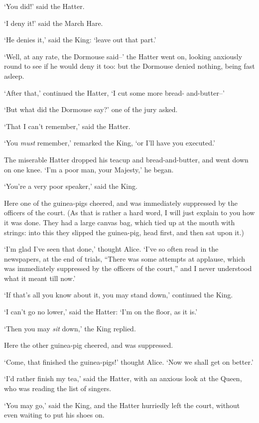   `You did!' said the Hatter.

  `I deny it!' said the March Hare.

  `He denies it,' said the King:  `leave out that part.'

  `Well, at any rate, the Dormouse said--' the Hatter went on,
looking anxiously round to see if he would deny it too:  but the
Dormouse denied nothing, being fast asleep.

  `After that,' continued the Hatter, `I cut some more bread-
and-butter--'

  `But what did the Dormouse say?' one of the jury asked.

  `That I can't remember,' said the Hatter.

  `You {\it must} remember,' remarked the King, `or I'll have you
executed.'

  The miserable Hatter dropped his teacup and bread-and-butter,
and went down on one knee.  `I'm a poor man, your Majesty,' he
began.

  `You're a very poor speaker,' said the King.

  Here one of the guinea-pigs cheered, and was immediately
suppressed by the officers of the court.  (As that is rather a
hard word, I will just explain to you how it was done.  They had
a large canvas bag, which tied up at the mouth with strings:
into this they slipped the guinea-pig, head first, and then sat
upon it.)

  `I'm glad I've seen that done,' thought Alice.  `I've so often
read in the newspapers, at the end of trials, ``There was some
attempts at applause, which was immediately suppressed by the
officers of the court,'' and I never understood what it meant
till now.'

  `If that's all you know about it, you may stand down,'
continued the King.

  `I can't go no lower,' said the Hatter:  `I'm on the floor, as
it is.'

  `Then you may {\it sit} down,' the King replied.

  Here the other guinea-pig cheered, and was suppressed.

  `Come, that finished the guinea-pigs!' thought Alice.  `Now we
shall get on better.'

  `I'd rather finish my tea,' said the Hatter, with an anxious
look at the Queen, who was reading the list of singers.

  `You may go,' said the King, and the Hatter hurriedly left the
court, without even waiting to put his shoes on.

